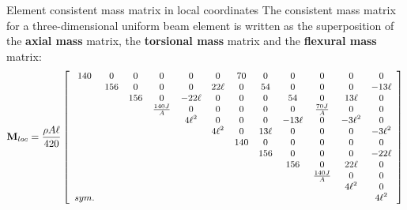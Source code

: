 \documentclass[aspectratio=169]{beamer}
\begin{document}
\begin{frame}{Element consistent mass matrix in local coordinates}
  The consistent mass matrix for a three-dimensional uniform beam element is written as the superposition of the \textbf{axial mass} matrix, the \textbf{torsional mass} matrix and the \textbf{flexural mass} matrix:
  $$\small \mathbf M_{loc}=\frac{\rho A \ell}{420}\left[
      \begin{array}{cccccccccccc}
        140  & 0   & 0   & 0              & 0       & 0       & 70  & 0      & 0       & 0              & 0        & 0        \\
             & 156 & 0   & 0              & 0       & 22\ell  & 0   & 54     & 0       & 0              & 0        & -13\ell  \\
             &     & 156 & 0              & -22\ell & 0       & 0   & 0      & 54      & 0              & 13\ell   & 0        \\
             &     &     & \frac{140J}{A} & 0       & 0       & 0   & 0      & 0       & \frac{70J}{A}  & 0        & 0        \\
             &     &     &                & 4\ell^2 & 0       & 0   & 0      & -13\ell & 0              & -3\ell^2 & 0        \\
             &     &     &                &         & 4\ell^2 & 0   & 13\ell & 0       & 0              & 0        & -3\ell^2 \\
             &     &     &                &         &         & 140 & 0      & 0       & 0              & 0        & 0        \\
             &     &     &                &         &         &     & 156    & 0       & 0              & 0        & -22\ell  \\
             &     &     &                &         &         &     &        & 156     & 0              & 22\ell   & 0        \\
             &     &     &                &         &         &     &        &         & \frac{140J}{A} & 0        & 0        \\
             &     &     &                &         &         &     &        &         &                & 4\ell^2  & 0        \\
        sym. &     &     &                &         &         &     &        &         &                &          & 4\ell^2  \\
      \end{array}
      \right]$$
\end{frame}
\end{document}
